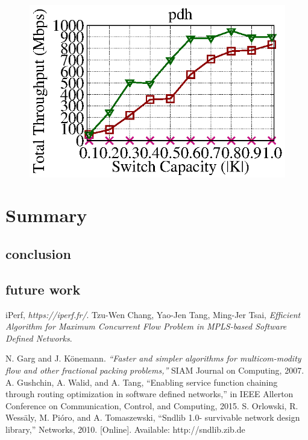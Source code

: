 \documentclass[a4paper,12pt]{report}
\begin{document}
\begin{large}
\begin{figure}[ht]
	  \includegraphics[width=1.0\textwidth]{pdh_geni_throughput_e05.eps}
  \end{figure}
  \chapter{Summary}
    \section{conclusion}
    \section{future work}
  \begin{thebibliography}{1}
    iPerf, \emph{https://iperf.fr/}.
    Tzu-Wen Chang, Yao-Jen Tang, Ming-Jer Tsai, \emph{Efficient Algorithm for Maximum Concurrent Flow Problem in MPLS-based Software Defined Networks}.
 
    N. Garg and J. Könemann. \emph{“Faster and simpler algorithms for multicom-modity flow and other fractional packing problems,”} SIAM Journal on
Computing, 2007.
	A. Gushchin, A. Walid, and A. Tang, “Enabling service function chaining
through routing optimization in software defined networks,” in IEEE
Allerton Conference on Communication, Control, and Computing, 2015.
	S. Orlowski, R. Wessäly, M. Pióro, and A. Tomaszewski, “Sndlib 1.0-
survivable network design library,” Networks, 2010. [Online]. Available:
http://sndlib.zib.de
\end{thebibliography}
  \end{large}
  
\end{document}
